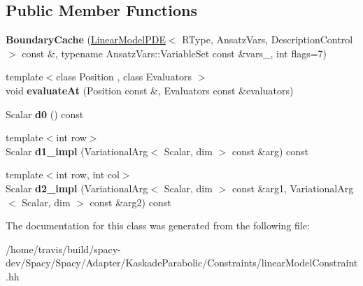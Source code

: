 \subsection*{Public Member Functions}
\begin{DoxyCompactItemize}
\item 
\hypertarget{classKaskade_1_1LinearModelPDE_1_1BoundaryCache_aa9a831a7ae4728d08fe8ad2d5b420172}{{\bfseries Boundary\-Cache} (\hyperlink{classKaskade_1_1LinearModelPDE}{Linear\-Model\-P\-D\-E}$<$ R\-Type, Ansatz\-Vars, Description\-Control $>$ const \&, typename Ansatz\-Vars\-::\-Variable\-Set const \&vars\-\_\-, int flags=7)}\label{classKaskade_1_1LinearModelPDE_1_1BoundaryCache_aa9a831a7ae4728d08fe8ad2d5b420172}

\item 
\hypertarget{classKaskade_1_1LinearModelPDE_1_1BoundaryCache_ab6fbbab7fba2ab7ab69b509da447795f}{{\footnotesize template$<$class Position , class Evaluators $>$ }\\void {\bfseries evaluate\-At} (Position const \&, Evaluators const \&evaluators)}\label{classKaskade_1_1LinearModelPDE_1_1BoundaryCache_ab6fbbab7fba2ab7ab69b509da447795f}

\item 
\hypertarget{classKaskade_1_1LinearModelPDE_1_1BoundaryCache_a3d2b8c6f35ff70078fc9f3b11bada339}{Scalar {\bfseries d0} () const }\label{classKaskade_1_1LinearModelPDE_1_1BoundaryCache_a3d2b8c6f35ff70078fc9f3b11bada339}

\item 
\hypertarget{classKaskade_1_1LinearModelPDE_1_1BoundaryCache_a7acfba065d7b56e98c47ce47e0c7219c}{{\footnotesize template$<$int row$>$ }\\Scalar {\bfseries d1\-\_\-impl} (Variational\-Arg$<$ Scalar, dim $>$ const \&arg) const }\label{classKaskade_1_1LinearModelPDE_1_1BoundaryCache_a7acfba065d7b56e98c47ce47e0c7219c}

\item 
\hypertarget{classKaskade_1_1LinearModelPDE_1_1BoundaryCache_ae5e14d1ba9dbc5d91401c5bd81b3cce0}{{\footnotesize template$<$int row, int col$>$ }\\Scalar {\bfseries d2\-\_\-impl} (Variational\-Arg$<$ Scalar, dim $>$ const \&arg1, Variational\-Arg$<$ Scalar, dim $>$ const \&arg2) const }\label{classKaskade_1_1LinearModelPDE_1_1BoundaryCache_ae5e14d1ba9dbc5d91401c5bd81b3cce0}

\end{DoxyCompactItemize}


The documentation for this class was generated from the following file\-:\begin{DoxyCompactItemize}
\item 
/home/travis/build/spacy-\/dev/\-Spacy/\-Spacy/\-Adapter/\-Kaskade\-Parabolic/\-Constraints/linear\-Model\-Constraint.\-hh\end{DoxyCompactItemize}
